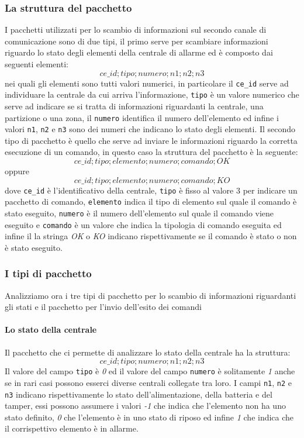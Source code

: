 \subsubsection{La struttura del pacchetto}
I pacchetti utilizzati per lo scambio di informazioni sul secondo canale di comunicazione sono di due tipi, il primo serve per scambiare informazioni riguardo lo stato degli elementi della centrale di allarme ed è composto dai seguenti elementi:
$$ce\_id;tipo;numero;n1;n2;n3$$
nei quali gli elementi sono tutti valori numerici, in particolare il \texttt{ce\_id} serve ad individuare la centrale da cui arriva l'informazione, \texttt{tipo} è un valore numerico che serve ad indicare se si tratta di informazioni riguardanti la centrale, una partizione o una zona, il \texttt{numero} identifica il numero dell'elemento ed infine i valori \texttt{n1}, \texttt{n2} e \texttt{n3} sono dei numeri che indicano lo stato degli elementi. Il secondo tipo di pacchetto è quello che serve ad inviare le informazioni riguardo la corretta esecuzione di un comando, in questo caso la struttura del pacchetto è la seguente:
$$ce\_id;tipo;elemento;numero;comando;OK$$
oppure
$$ce\_id;tipo;elemento;numero;comando;KO$$
dove \texttt{ce\_id} è l'identificativo della centrale, \texttt{tipo} è fisso al valore 3 per indicare un pacchetto di comando, \texttt{elemento} indica il tipo di elemento sul quale il comando è stato eseguito, \texttt{numero} è il numero dell'elemento sul quale il comando viene eseguito  e \texttt{comando} è un valore che indica la tipologia di comando eseguita ed infine il la stringa \emph{OK} o \emph{KO} indicano rispettivamente se il comando è stato o non è stato eseguito.
\subsubsection{I tipi di pacchetto}
Analizziamo ora i tre tipi di pacchetto per lo scambio di informazioni riguardanti gli stati e il pacchetto per l'invio dell'esito dei comandi
\paragraph{Lo stato della centrale}
Il pacchetto che ci permette di analizzare lo stato della centrale ha la struttura:
$$ce\_id;tipo;numero;n1;n2;n3$$
Il valore del campo \texttt{tipo} è \emph{0} ed il valore del campo \texttt{numero} è solitamente \emph{1} anche se in rari casi possono esserci diverse centrali collegate tra loro. I campi \texttt{n1}, \texttt{n2} e \texttt{n3} indicano rispettivamente lo stato dell'alimentazione, della batteria e del tamper, essi possono assumere i valori \emph{-1} che indica che l'elemento non ha uno stato definito, \emph{0} che l'elemento è in uno stato di riposo ed infine \emph{1} che indica che il corrispettivo elemento è in allarme.
